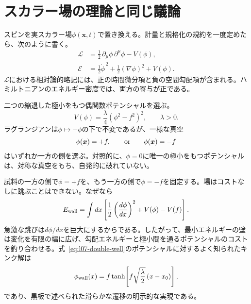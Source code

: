 \section{スカラー場の理論と同じ議論}

スピンを実スカラー場\(\phi(\bm{x},t)\)で置き換える。計量と規格化の規約を一度定めたら、次のように書く。
\begin{equation}
\begin{aligned}
  \mathcal L
  &=\frac12\,\partial_\mu\phi\,\partial^\mu\phi-V(\phi),
  \\
  \mathcal E
  &=\frac12\dot\phi^{\,2}+\frac12(\nabla\phi)^2+V(\phi).
\end{aligned}
  \label{eq:l07-real-scalar}
\end{equation}
\(\mathcal L\)における相対論的略記には、正の時間微分項と負の空間勾配項が含まれる。ハミルトニアンのエネルギー密度では、両方の寄与が正である。

二つの縮退した極小をもつ偶関数ポテンシャルを選ぶ。
\begin{equation}
  V(\phi)=\frac{\lambda}{4}\left(\phi^2-f^2\right)^2,
  \qquad \lambda>0.
  \label{eq:l07-double-well}
\end{equation}
ラグランジアンは\(\phi\mapsto-\phi\)の下で不変であるが、一様な真空
\begin{equation}
  \phi(\bm{x})=+f,
  \qquad\hbox{or}\qquad
  \phi(\bm{x})=-f
\end{equation}
はいずれか一方の側を選ぶ。対照的に、\(\phi=0\)に唯一の極小をもつポテンシャルは、対称な真空をもち、自発的に破れていない。

試料の一方の側で\(\phi=+f\)を、もう一方の側で\(\phi=-f\)を固定する。場はコストなしに跳ぶことはできない。なぜなら
\begin{equation}
  E_{\rm wall}
  =\int dx\left[
      \frac12\left(\frac{d\phi}{dx}\right)^2+V(\phi)-V(f)
    \right].
  \label{eq:l07-wall-energy}
\end{equation}
急激な跳びは\(d\phi/dx\)を巨大にするからである。したがって、最小エネルギーの壁は変化を有限の幅に広げ、勾配エネルギーと極小間を通るポテンシャルのコストを釣り合わせる。式~\eqref{eq:l07-double-well}のポテンシャルに対するよく知られたキンク解は
\begin{equation}
  \phi_{\rm wall}(x)
  =f\tanh\!\left[f\sqrt{\frac{\lambda}{2}}\,(x-x_0)\right],
  \label{eq:l07-kink}
\end{equation}
であり、黒板で述べられた滑らかな遷移の明示的な実現である。

